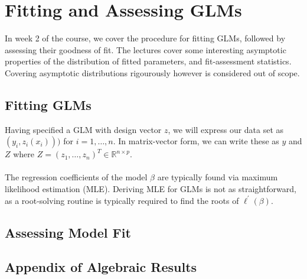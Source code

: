 
\section{Fitting and Assessing GLMs}
In week 2 of the course, we cover the procedure for fitting GLMs, followed by assessing their goodness of fit. The lectures cover some interesting asymptotic properties of the distribution of fitted parameters, and fit-assessment statistics. Covering asymptotic distributions rigourously however is considered out of scope.

\subsection{Fitting GLMs}
Having specified a GLM with design vector $z$, we will express our data set as $(y_i, z_i(x_i)))$ for $i=1,\dots,n$. In matrix-vector form, we can write these as $y$ and $Z$ where $Z = (z_1, \dots, z_n)^T\in\mathbb{R}^{n\times p}$. \\
\\
The regression coefficients of the model $\beta$ are typically found via maximum likelihood estimation (MLE). Deriving MLE for GLMs is not as straightforward, as a root-solving routine is typically required to find the roots of $\ell^\prime(\beta)$.

\begin{definition}
    
\end{definition}


\subsection{Assessing Model Fit}

\subsection{Appendix of Algebraic Results}
